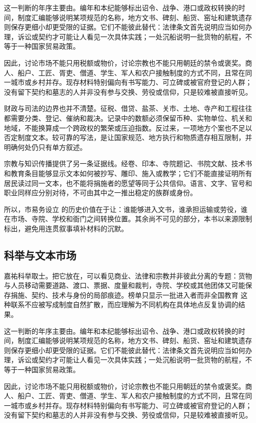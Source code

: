 这一判断的年序主要由。编年和本纪能够标出诏令、战争、港口或政权转换的时间，制度汇编能够说明某项规范的名称，地方文书、碑刻、船货、窑址和建筑遗存则保存更细小却更受限的证据。它们不能彼此替代：法律条文首先说明应当如何办理，诉讼或契约才可能让人看见一次具体实践；一处沉船说明一批货物的航程，不等于一种国家贸易政策。

因此，讨论市场不能只用税额或物价，讨论宗教也不能只用朝廷的禁令或褒奖。商人、船户、工匠、胥吏、僧道、学生、军人和农户接触制度的方式不同，且常在同一城市或乡村并存。现存材料特别偏向有书写能力、可立碑或被官府登记的人群；没有留下契约和墓志的人并非没有参与交换、劳役或信仰，只是较难被直接听见。

财政与司法的边界也并不清楚。征税、借贷、盐茶、关市、土地、寺产和工程往往都需要分类、登记、催纳和裁决。记录中的数额必须保留币种、实物单位、机关和地域，不能换算成一个跨政权的繁荣或压迫指数。反过来，一项地方个案也不足以否定制度文本。较可靠的写法，是让国家规范、地方执行和物质遗存相互限制，并明确何处仍只有单方叙述。

宗教与知识传播提供了另一条证据线。经卷、印本、寺院题记、书院文献、技术书和教育条目能够显示文本如何被抄写、雕印、施入或教学；它们不能直接证明所有居民读过同一文本，也不能将捐施者的愿望等同于公共信仰。语言、文字、官号和职业同样应分别对待，不可由其中之一推出稳定的族群或身份。

所以，市易务设立 的历史价值在于让：谁能够进入文书，谁承担运输或劳役，谁在市场、寺院、学校和衙门之间转换位置。其余尚不可见的部分，本书以来源限制标出，避免用连贯叙事填补材料的沉默。

\subsection{科举与文本市场}

嘉祐科举取士。把它放在，可以看见商业、法律和宗教并非彼此分离的专题：货物与人员移动需要道路、渡口、票据、度量和裁判，寺院、学校或其他团体又可能保存捐施、契约、技术与身份的局部痕迹。榜单只显示一批进入者而非全国教育 这种联系不应被写成制度自然扩散，而应理解为不同机构在具体地点反复协调的结果。

这一判断的年序主要由。编年和本纪能够标出诏令、战争、港口或政权转换的时间，制度汇编能够说明某项规范的名称，地方文书、碑刻、船货、窑址和建筑遗存则保存更细小却更受限的证据。它们不能彼此替代：法律条文首先说明应当如何办理，诉讼或契约才可能让人看见一次具体实践；一处沉船说明一批货物的航程，不等于一种国家贸易政策。

因此，讨论市场不能只用税额或物价，讨论宗教也不能只用朝廷的禁令或褒奖。商人、船户、工匠、胥吏、僧道、学生、军人和农户接触制度的方式不同，且常在同一城市或乡村并存。现存材料特别偏向有书写能力、可立碑或被官府登记的人群；没有留下契约和墓志的人并非没有参与交换、劳役或信仰，只是较难被直接听见。


